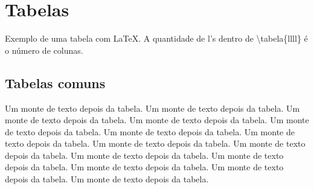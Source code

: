 \chapter{Tabelas}

Exemplo de uma tabela com LaTeX. A quantidade de l's dentro de \textbackslash tabela\{llll\} é o número de colunas.

\section{Tabelas comuns}


Um monte de texto depois da tabela. Um monte de texto depois da tabela. Um monte de texto depois da tabela. Um monte de texto depois da tabela. Um monte de texto depois da tabela. Um monte de texto depois da tabela. Um monte de texto depois da tabela. Um monte de texto depois da tabela. Um monte de texto depois da tabela. Um monte de texto depois da tabela. Um monte de texto depois da tabela. Um monte de texto depois da tabela. Um monte de texto depois da tabela. Um monte de texto depois da tabela. 